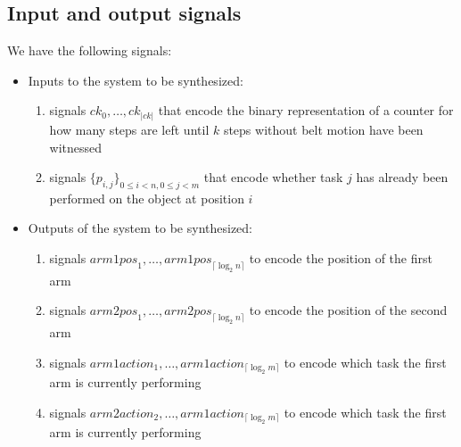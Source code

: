 \documentclass[a4paper,10pt]{IEEEtran}
\begin{document}
\subsection{Input and output signals}
%
\noindent We have the following signals:
\begin{itemize}
\item Inputs to the system to be synthesized:
\begin{enumerate}
\item signals $\mathit{ck}_0, \ldots, \mathit{ck}_{|\mathit{ck}|}$ that encode the binary representation of a counter for how many steps are left until $k$ steps without belt motion have been witnessed
\item signals $\{\mathit{p}_{i,j} \}_{0 \leq i < n, 0 \leq j < m}$ that encode whether task $j$ has already been performed on the object at position $i$ 
\end{enumerate}
\item Outputs of the system to be synthesized:
\begin{enumerate}
\item signals $\mathit{arm1pos}_1,  \ldots, \mathit{arm1pos}_{\lceil \log_2 n \rceil}$ to encode the position of the first arm
\item signals $\mathit{arm2pos}_1,  \ldots, \mathit{arm2pos}_{\lceil \log_2 n \rceil}$ to encode the position of the second arm
\item signals $\mathit{arm1action}_1,  \ldots, \mathit{arm1action}_{\lceil \log_2 m \rceil}$ to encode which task the first arm is currently performing
\item signals $\mathit{arm2action}_2,  \ldots, \mathit{arm1action}_{\lceil \log_2 m \rceil}$ to encode which task the first arm is currently performing
\end{enumerate}
\end{itemize}
\end{document}
